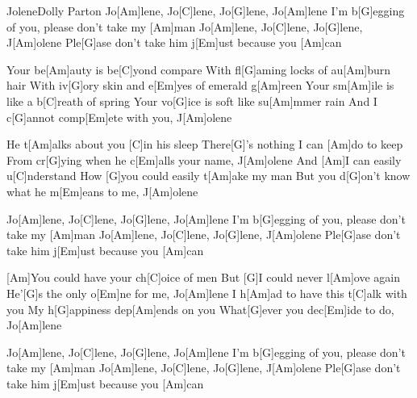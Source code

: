 \documentclass[../main.tex]{subfiles}
\begin{document}
\begin{song}[4]{Jolene}{Dolly Parton}{}
Jo[Am]lene, Jo[C]lene, Jo[G]lene, Jo[Am]lene
I'm b[G]egging of you, please don't take my [Am]man
Jo[Am]lene, Jo[C]lene, Jo[G]lene, J[Am]olene
Ple[G]ase don't take him j[Em]ust because you [Am]can

Your be[Am]auty is be[C]yond compare
With fl[G]aming locks of au[Am]burn hair
With iv[G]ory skin and e[Em]yes of emerald g[Am]reen
Your sm[Am]ile is like a b[C]reath of spring
Your vo[G]ice is soft like su[Am]mmer rain
And I c[G]annot comp[Em]ete with you, J[Am]olene

He t[Am]alks about you [C]in his sleep
There[G]'s nothing I can [Am]do to keep
From cr[G]ying when he c[Em]alls your name, J[Am]olene
And [Am]I can easily u[C]nderstand
How [G]you could easily t[Am]ake my man
But you d[G]on't know what he m[Em]eans to me, J[Am]olene

Jo[Am]lene, Jo[C]lene, Jo[G]lene, Jo[Am]lene
I'm b[G]egging of you, please don't take my [Am]man
Jo[Am]lene, Jo[C]lene, Jo[G]lene, J[Am]olene
Ple[G]ase don't take him j[Em]ust because you [Am]can

[Am]You could have your ch[C]oice of men
But [G]I could never l[Am]ove again
He'[G]s the only o[Em]ne for me, Jo[Am]lene
I h[Am]ad to have this t[C]alk with you
My h[G]appiness dep[Am]ends on you
What[G]ever you dec[Em]ide to do, Jo[Am]lene

Jo[Am]lene, Jo[C]lene, Jo[G]lene, Jo[Am]lene
I'm b[G]egging of you, please don't take my [Am]man
Jo[Am]lene, Jo[C]lene, Jo[G]lene, J[Am]olene
Ple[G]ase don't take him j[Em]ust because you [Am]can

\end{song}
\end{document}
